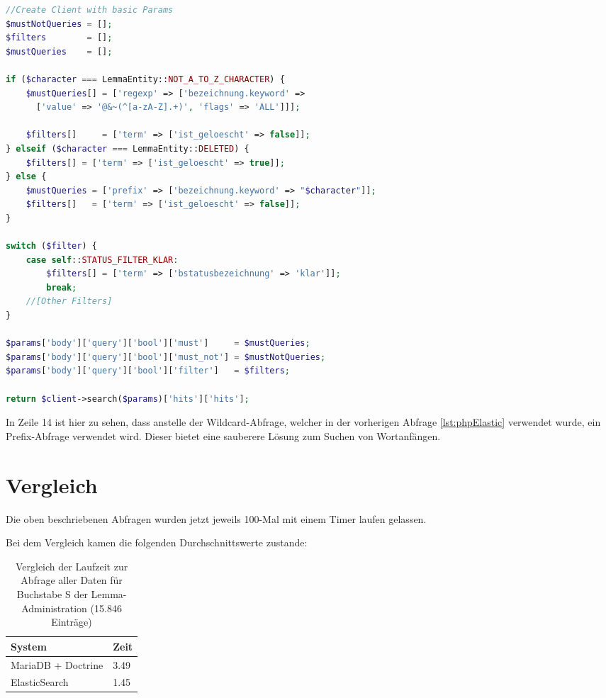\begin{lstlisting}[language=PHP, frame=single, label={lst:queryEla}] 
//Create Client with basic Params
$mustNotQueries = [];
$filters        = [];
$mustQueries    = [];

if ($character === LemmaEntity::NOT_A_TO_Z_CHARACTER) {
    $mustQueries[] = ['regexp' => ['bezeichnung.keyword' => 
      ['value' => '@&~(^[a-zA-Z].+)', 'flags' => 'ALL']]];
      
    $filters[]     = ['term' => ['ist_geloescht' => false]];
} elseif ($character === LemmaEntity::DELETED) {
    $filters[] = ['term' => ['ist_geloescht' => true]];
} else {
    $mustQueries = ['prefix' => ['bezeichnung.keyword' => "$character"]];
    $filters[]   = ['term' => ['ist_geloescht' => false]];
}

switch ($filter) {
    case self::STATUS_FILTER_KLAR:
        $filters[] = ['term' => ['bstatusbezeichnung' => 'klar']];
        break;
    //[Other Filters]
}

$params['body']['query']['bool']['must']     = $mustQueries;
$params['body']['query']['bool']['must_not'] = $mustNotQueries;
$params['body']['query']['bool']['filter']   = $filters;

return $client->search($params)['hits']['hits'];
\end{lstlisting}

In Zeile 14 ist hier zu sehen, dass anstelle der Wildcard-Abfrage, welcher in der vorherigen Abfrage \ref{lst:phpElastic} verwendet wurde, ein Prefix-Abfrage verwendet wird. Dieser bietet eine sauberere Lösung zum Suchen von Wortanfängen.

\section{Vergleich}

Die oben beschriebenen Abfragen wurden jetzt jeweils 100-Mal mit einem Timer laufen gelassen. 

Bei dem Vergleich kamen die folgenden Durchschnittswerte zustande:
\begin{table} %
	\centering
		\begin{tabular}{l | l }
		    \textbf{System} & \textbf{Zeit} \\
        \hline
        MariaDB + Doctrine & 3.49 \\
        ElasticSearch      & 1.45  \\
		\end{tabular}
    \caption{Vergleich der Laufzeit zur Abfrage aller Daten für Buchstabe S der Lemma-Administration (15.846 Einträge)}
    \label{vlgTimeDBvsEla}
\end{table}

